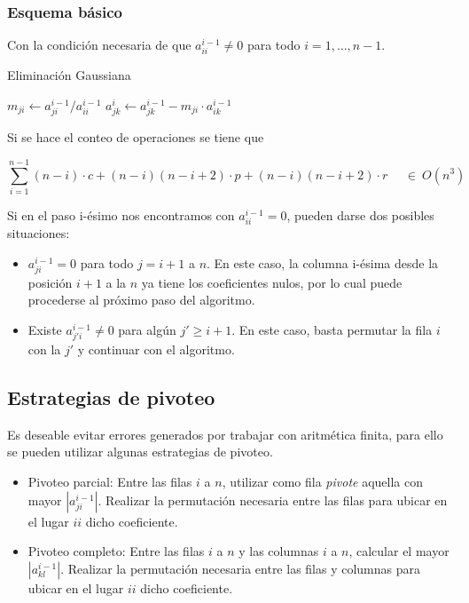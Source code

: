 \newpage

\subsubsection{Esquema básico}
\label{subsubsec:eg_esquema_basico}

Con la condición necesaria de que $a_{ii}^{i-1} \neq 0$ para todo $i = 1,\ldots,n-1$.

\begin{algorithm}
\begin{algorithmic}
\caption{Eliminación Gaussiana}
\label{alg:eg}
        \State $m_{ji} \gets a_{ji}^{i-1}/a_{ii}^{i-1}$ 
            \State $a_{jk}^{i} \gets a_{jk}^{i-1} - m_{ji}\cdot a_{ik}^{i-1}$ 
        \EndFor    
    \EndFor
\EndFor
\end{algorithmic}
\end{algorithm}

Si se hace el conteo de operaciones se tiene que

\[
\sum_{i=1}^{n-1} (n-i)\cdot c + (n-i)(n-i+2)\cdot p + (n-i)(n-i + 2)\cdot r ~~~~~~\in~ O(n^3)
\]

Si en el paso i-ésimo nos encontramos con $a_{ii}^{i-1} = 0$, pueden darse dos posibles situaciones:
\begin{itemize}
    \item $a_{ji}^{i-1} = 0$ para todo $j = i+1$ a $n$. En este caso, la columna i-ésima desde la posición $i+1$ a la $n$ ya tiene los coeficientes nulos, por lo cual puede procederse al próximo paso del algoritmo.
    \item Existe $a_{j'i}^{i-1} \neq 0$ para algún $j' \geq i+1$. En este caso, basta permutar la fila $i$ con la $j'$ y continuar con el algoritmo.
\end{itemize}

\subsection{Estrategias de pivoteo}
\label{subsec:estrategias_de_pivoteo}

Es deseable evitar errores generados por trabajar con aritmética finita, para ello se pueden utilizar algunas estrategias de pivoteo.

\begin{itemize}
    \item Pivoteo parcial: Entre las filas $i$ a $n$, utilizar como fila \emph{pivote} aquella con mayor $|a_{ji}^{i-1}|$. Realizar la permutación necesaria entre las filas para ubicar en el lugar $ii$ dicho coeficiente.
    \item Pivoteo completo: Entre las filas $i$ a $n$ y las columnas $i$ a $n$, calcular el mayor $|a_{kl}^{i-1}|$. Realizar la permutación necesaria entre las filas y columnas para ubicar en el lugar $ii$ dicho coeficiente.
\end{itemize}




